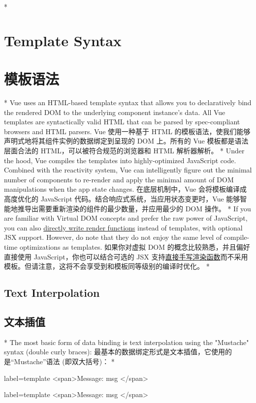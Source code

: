 \begin{paracol}{2}
\switchcolumn[0]*%
\section{Template Syntax}
\switchcolumn
\section{模板语法}
\switchcolumn[0]*%
Vue uses an HTML-based template syntax that allows you to declaratively
bind the rendered DOM to the underlying component instance's data. All
Vue templates are syntactically valid HTML that can be parsed by
spec-compliant browsers and HTML parsers.
\switchcolumn
Vue 使用一种基于 HTML
的模板语法，使我们能够声明式地将其组件实例的数据绑定到呈现的 DOM
上。所有的 Vue 模板都是语法层面合法的 HTML，可以被符合规范的浏览器和
HTML 解析器解析。
\switchcolumn[0]*%
Under the hood, Vue compiles the templates into highly-optimized
JavaScript code. Combined with the reactivity system, Vue can
intelligently figure out the minimal number of components to re-render
and apply the minimal amount of DOM manipulations when the app state
changes.
\switchcolumn
在底层机制中，Vue 会将模板编译成高度优化的 JavaScript
代码。结合响应式系统，当应用状态变更时，Vue
能够智能地推导出需要重新渲染的组件的最少数量，并应用最少的 DOM 操作。
\switchcolumn[0]*%
If you are familiar with Virtual DOM concepts and prefer the raw power
of JavaScript, you can also
\href{https://vuejs.org/guide/extras/render-function.html}{directly
write render functions} instead of templates, with optional JSX support.
However, do note that they do not enjoy the same level of compile-time
optimizations as templates.
\switchcolumn
如果你对虚拟 DOM 的概念比较熟悉，并且偏好直接使用
JavaScript，你也可以结合可选的 JSX
支持\href{https://cn.vuejs.org/guide/extras/render-function.html}{直接手写渲染函数}而不采用模板。但请注意，这将不会享受到和模板同等级别的编译时优化。
\switchcolumn[0]*%
\subsection{Text Interpolation}
\switchcolumn
\subsection{文本插值}
\switchcolumn[0]*%
The most basic form of data binding is text interpolation using the
"Mustache" syntax (double curly braces):
\switchcolumn
最基本的数据绑定形式是文本插值，它使用的是``Mustache''语法
(即双大括号)：
\switchcolumn[0]*%
\begin{codeHtml*}{label=template}
<span>Message: {{ msg }}</span>
\end{codeHtml*}  
\switchcolumn
\begin{codeHtml*}{label=template}
<span>Message: {{ msg }}</span>
\end{codeHtml*}  

\end{paracol}
